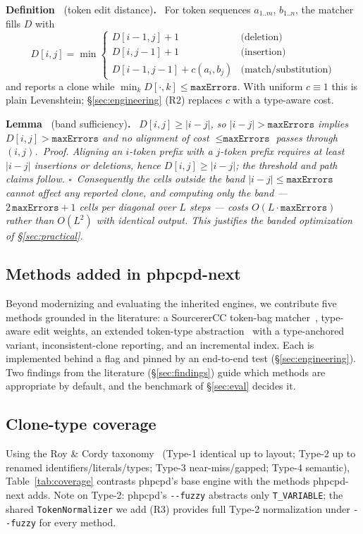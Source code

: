 \documentclass[10pt,a4paper]{article}
\newcounter{defn}[section]
\newcommand{\defn}[1]{\par\medskip\refstepcounter{defn}%
  \noindent\textbf{Definition~\thedefn} (#1)\textbf{.}\ }
\newcounter{prop}[section]
\newcounter{lem}[section]
\newcommand{\lem}[1]{\par\medskip\refstepcounter{lem}%
  \noindent\textbf{Lemma~\thelem} (#1)\textbf{.}\ \itshape}
\begin{document}
\defn{token edit distance}
For token sequences $a_{1..m}$, $b_{1..n}$, the matcher fills $D$ with
\[
D[i,j]=\min\!\begin{cases}
D[i\!-\!1,j]+1 & \text{(deletion)}\\
D[i,j\!-\!1]+1 & \text{(insertion)}\\
D[i\!-\!1,j\!-\!1]+c(a_i,b_j) & \text{(match/substitution)}
\end{cases}
\]
and reports a clone while $\min_k D[\cdot,k]\le \texttt{maxErrors}$. With uniform $c\equiv 1$ this is
plain Levenshtein; \S\ref{sec:engineering} (R2) replaces $c$ with a type-aware cost.

\lem{band sufficiency}
$D[i,j]\ge |i-j|$, so $|i-j| > \texttt{maxErrors}$ implies $D[i,j] > \texttt{maxErrors}$ and no
alignment of cost $\le \texttt{maxErrors}$ passes through $(i,j)$.\upshape\
\emph{Proof.} Aligning an $i$-token prefix with a $j$-token prefix requires at least $|i-j|$ insertions
or deletions, hence $D[i,j]\ge|i-j|$; the threshold and path claims follow. $\square$\ Consequently the
cells outside the band $|i-j|\le\texttt{maxErrors}$ cannot affect any reported clone, and computing only
the band --- $2\,\texttt{maxErrors}+1$ cells per diagonal over $L$ steps --- costs
$O(L\cdot\texttt{maxErrors})$ rather than $O(L^2)$ with identical output. This justifies the banded
optimization of \S\ref{sec:practical}.

\subsection{Methods added in phpcpd-next}
Beyond modernizing and evaluating the inherited engines, we contribute five methods grounded in the
literature: a SourcererCC token-bag matcher~\cite{sourcerercc}, type-aware edit weights, an extended
token-type abstraction~\cite{toma} with a type-anchored variant, inconsistent-clone reporting, and an
incremental index. Each is implemented behind a flag and pinned by an end-to-end test
(\S\ref{sec:engineering}). Two findings from the literature (\S\ref{sec:findings}) guide which methods
are appropriate by default, and the benchmark of \S\ref{sec:eval} decides it.

\subsection{Clone-type coverage}
Using the Roy \& Cordy taxonomy~\cite{roycordy} (Type-1 identical up to layout; Type-2 up to renamed
identifiers/literals/types; Type-3 near-miss/gapped; Type-4 semantic), Table~\ref{tab:coverage}
contrasts phpcpd's base engine with the methods phpcpd-next adds. Note on Type-2: phpcpd's
\texttt{-{}-fuzzy} abstracts only \lstinline!T_VARIABLE!; the shared \texttt{TokenNormalizer} we add
(R3) provides full Type-2 normalization under \texttt{-{}-fuzzy} for every method.
\end{document}
